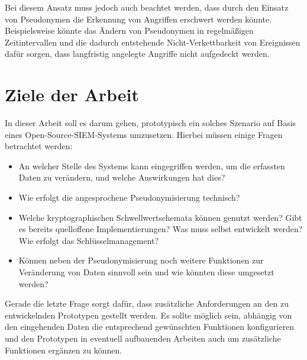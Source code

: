 Bei diesem Ansatz muss jedoch auch beachtet werden, dass durch den Einsatz von Pseudonymen die Erkennung von Angriffen erschwert werden könnte. Beispielsweise könnte das Ändern von Pseudonymen in regelmäßigen Zeitintervallen und die dadurch entstehende Nicht-Verkettbarkeit von Ereignissen dafür sorgen, dass langfristig angelegte Angriffe nicht aufgedeckt werden.

\section*{Ziele der Arbeit}






In dieser Arbeit soll es darum gehen, prototypisch ein solches Szenario auf Basis eines Open-Source-SIEM-Systems umzusetzen. 
Hierbei müssen einige Fragen betrachtet werden:

\begin{itemize}
\item An welcher Stelle des Systems kann eingegriffen werden, um die erfassten Daten zu verändern, und welche Auswirkungen hat dies?
\item Wie erfolgt die angesprochene Pseudonymisierung technisch?
\item Welche kryptographischen Schwellwertschemata können genutzt werden? Gibt es bereits quelloffene Implementierungen? Was muss selbst entwickelt werden? Wie erfolgt das Schlüsselmanagement?
\item Können neben der Pseudonymisierung noch weitere Funktionen zur Veränderung von Daten sinnvoll sein und wie könnten diese umgesetzt werden?
\end{itemize}

Gerade die letzte Frage sorgt dafür, dass zusätzliche Anforderungen an den zu entwickelnden Prototypen gestellt werden. Es sollte möglich sein, abhängig von den eingehenden Daten die entsprechend gewünschten Funktionen konfigurieren und den Prototypen in eventuell aufbauenden Arbeiten auch um zusätzliche Funktionen ergänzen zu können.

